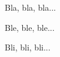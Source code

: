 Bla, bla, bla...

\begin{bdocexa}
    Ble, ble, ble...
\end{bdocexa}

\begin{bdocexa}[Magnifique]
    Bli, bli, bli...
\end{bdocexa}

%
